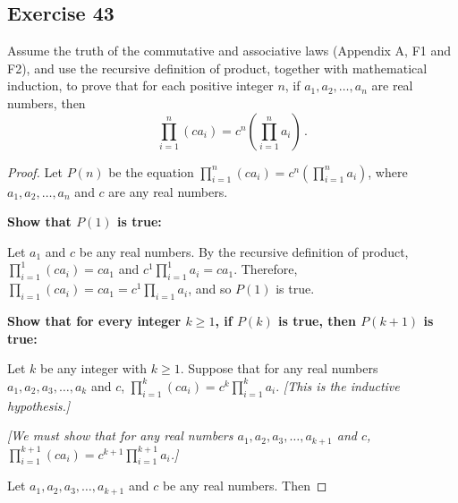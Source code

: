 \documentclass[14pt]{extarticle}
\newcommand{\dps}{\displaystyle}
\begin{document}
    \subsection{Exercise 43}
    Assume the truth of the commutative and associative laws (Appendix A, F1 and F2), and use the recursive definition
    of product, together with mathematical induction, to prove that for each positive integer $n$, if $a_1, a_2, \ldots,
a_n$ are real numbers, then
    \[
        \prod_{i = 1}^{n}(ca_i) = c^n \left(\prod_{i = 1}^{n} a_i \right) \,.
    \]
    \begin{proof}
        Let $P(n)$ be the equation \(\dps \prod_{i = 1}^{n}(ca_i) = c^n \left(\prod_{i = 1}^{n} a_i \right)\), where
        \(a_1, a_2, \ldots, a_n\) and $c$ are any real numbers.

            {\bf Show that $P(1)$ is true:}

        Let $a_1$ and $c$ be any real numbers. By the recursive
        definition of product,
        \(\dps \prod_{i=1}^1 (c a_i) = c a_1\) and \(\dps c^1 \prod_{i=1}^1 a_i = c a_1\).
        Therefore, \(\dps \prod_{i=1} (c a_i) = c a_1 = c^1 \prod_{i=1} a_i\), and so $P(1)$ is true.

            {\bf Show that for every integer \(k \geq 1\), if $P(k)$ is true, then \(P(k + 1)\) is true:}

        Let $k$ be any integer with \(k \geq 1\). Suppose that for any real numbers \(a_1, a_2, a_3, \ldots, a_k\) and $c$,
        \(\dps \prod_{i=1}^k (c a_i) = c^k \prod_{i=1}^k a_i\). {\it [This is the inductive hypothesis.]}

            {\it [We must show that for any real numbers \(a_1, a_2, a_3, \ldots, a_{k+1}\) and $c$, \(\dps \prod_{i=1}^{k+1}
                    (c a_i) = c^{k+1} \prod_{i=1}^{k+1} a_i\).]}

        Let \(a_1, a_2, a_3, \ldots, a_{k+1}\) and $c$ be any real numbers. Then


\end{proof}
\end{document}
